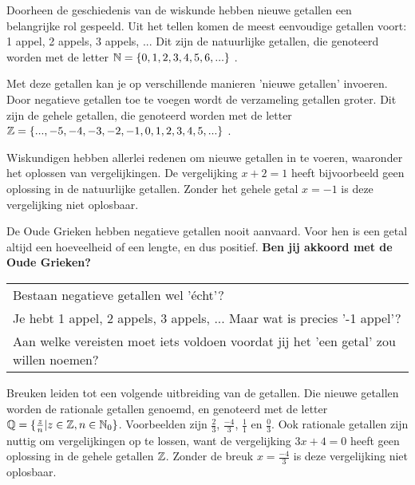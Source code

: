 \documentclass{ximera}
\begin{document}
    \author{Kwinten Obbels}

Doorheen de geschiedenis van de wiskunde hebben nieuwe getallen een belangrijke rol gespeeld.
Uit het tellen komen de meest eenvoudige getallen voort: 1 appel, 2 appels, 3 appels, ... 
Dit zijn de natuurlijke getallen, die genoteerd worden met de letter \( \mathbb{N} = \{0, 1, 2, 3, 4, 5, 6, ...\} \) . 

Met deze getallen kan je op verschillende manieren 'nieuwe getallen' invoeren. 
Door negatieve getallen toe te voegen wordt de verzameling getallen groter.  
Dit zijn de gehele getallen, die genoteerd worden met de letter  \( \mathbb{Z} = \{..., -5, -4, -3, -2, -1, 0, 1, 2, 3, 4, 5, ...\} \) . 

Wiskundigen hebben allerlei redenen om nieuwe getallen in te voeren, waaronder het oplossen van vergelijkingen. 
De vergelijking \(x + 2 = 1\) heeft bijvoorbeeld geen oplossing in de natuurlijke getallen.
Zonder het gehele getal \(x = -1\) is deze vergelijking niet oplosbaar. 


\begin{denkvraag*}{}
    De Oude Grieken hebben negatieve getallen nooit aanvaard. 
    Voor hen is een getal altijd een hoeveelheid of een lengte, en dus positief. 
    \textbf{Ben jij akkoord met de Oude Grieken?}
    \\
\begin{tabular}{@{\qquad}l}
    Bestaan negatieve getallen wel 'écht'? \\
    Je hebt 1 appel, 2 appels, 3 appels, ... Maar wat is precies '-1 appel'? \\
    Aan welke vereisten moet iets voldoen voordat jij het 'een getal' zou willen noemen? \\
\end{tabular}
\end{denkvraag*}


Breuken leiden tot een volgende uitbreiding van de getallen.
Die nieuwe getallen worden de rationale getallen genoemd, en genoteerd met de letter \( \mathbb{Q}  = \{\frac{z}{n} | z \in \mathbb{Z}, n \in \mathbb{N}_0 \}\).
Voorbeelden zijn \(\frac{2}{3}\), \(\frac{-4}{3}\), \(\frac{1}{1}\) en \(\frac{0}{3}\). 
Ook rationale getallen zijn nuttig om vergelijkingen op te lossen, 
want de vergelijking \(3x + 4 = 0\) heeft geen oplossing in de gehele getallen \( \mathbb{Z} \).
Zonder de breuk \(x = \frac{-4}{3}\) is deze vergelijking niet oplosbaar.
\end{document}
